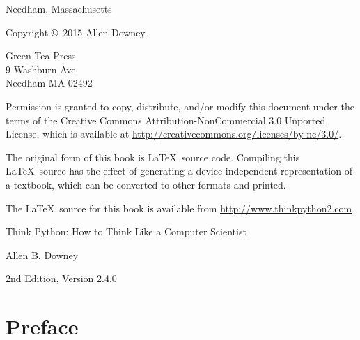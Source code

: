 \documentclass[10pt]{book}
\newcommand{\thetitle}{Think Python: How to Think Like a Computer Scientist}
\newcommand{\theversion}{2nd Edition, Version 2.4.0}
\newcommand{\thedate}{}
\begin{document}
\begin{latexonly}
\begin{flushright}
{\small Needham, Massachusetts}

\vfill

\end{flushright}


\pagebreak
\thispagestyle{empty}

{\small
Copyright \copyright ~2015 Allen Downey.


\vspace{0.2in}

\begin{flushleft}
Green Tea Press       \\
9 Washburn Ave        \\
Needham MA 02492
\end{flushleft}

Permission is granted to copy, distribute, and/or modify this document
under the terms of the Creative Commons Attribution-NonCommercial 3.0 Unported
License, which is available at \url{http://creativecommons.org/licenses/by-nc/3.0/}.

The original form of this book is \LaTeX\ source code.  Compiling this
\LaTeX\ source has the effect of generating a device-independent
representation of a textbook, which can be converted to other formats
and printed.

The \LaTeX\ source for this book is available from
\url{http://www.thinkpython2.com}

\vspace{0.2in}

} %

\end{latexonly}



\begin{htmlonly}


{\Large \thetitle}

{\large Allen B. Downey}

\theversion

\thedate

\setcounter{chapter}{-1}

\end{htmlonly}

\fi


\chapter{Preface}
\end{document}
